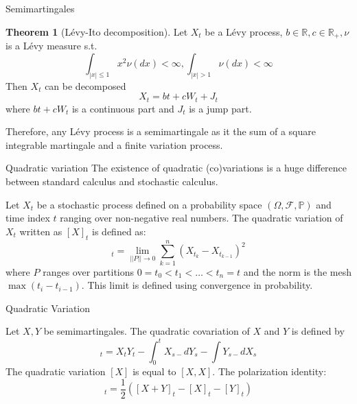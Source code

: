 \documentclass{beamer}%
\theoremstyle{definition}
\newtheorem{mytheor}[theorem]{Theorem}
\renewcommand{\P}{\mathbb{P}}
\newcommand{\F}{\mathcal{F}}
\begin{document}
\begin{frame}{Semimartingales}
    \begin{mytheor}[Lévy-Ito decomposition]
        Let $X_t$ be a Lévy process, $b \in \mathbb{R}, c \in \mathbb{R_+}, \nu$ is a Lévy measure s.t. $$\int_{|x| \leq 1} x^2 \nu(dx) < \infty, \int_{|x| > 1}\nu(dx) < \infty$$
        Then $X_t$ can be decomposed 
        \begin{equation*}
            X_t = bt + c W_t + J_t
        \end{equation*}
        where $bt + cW_t$ is a continuous part and $J_t$ is a jump part.
    \end{mytheor}
    Therefore, any Lévy process is a semimartingale as it the sum of a square integrable martingale and a finite variation process.
\end{frame}
\begin{frame}{Quadratic variation}
        The existence of quadratic (co)variations is a huge difference between standard calculus and stochastic calculus. 
    \begin{definition}
        Let $X_t$ be a stochastic process defined on a probability space $(\Omega, \F, \P)$ and time index $t$ ranging over non-negative real numbers. The quadratic variation of $X_t$ written as $[X]_t$ is defined as:
        \begin{equation*}
            [X]_t = \lim_{||P|| \to 0} \sum_{k=1}^n (X_{t_k} - X_{t_{k-1}})^2
        \end{equation*}
        where $P$ ranges over partitions $0 = t_0 < t_1< \dots < t_n = t$ and the norm is the mesh $\max(t_i - t_{i-1})$. This limit is defined using convergence in probability.
    \end{definition}
\end{frame}
\begin{frame}{Quadratic Variation}
    \begin{definition}
        Let $X, Y$ be semimartingales. The quadratic covariation of $X$ and $Y$ is defined by
        \begin{equation*}
            [X, Y]_t = X_tY_t - \int_0^t X_{s-}dY_s - \int Y_{s-} dX_s
        \end{equation*}
        The quadratic variation $[X]$ is equal to $[X, X]$. The polarization identity:
        \begin{equation*}
            [X, Y]_t = \frac{1}{2}([X+Y]_t - [X]_t - [Y]_t)
        \end{equation*}
    \end{definition}
\end{frame}
\end{document}
